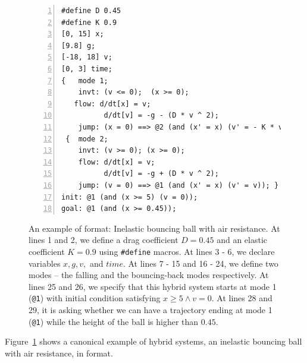 \begin{figure}
  \centering
  \begin{Verbatim}[fontfamily=courier, frame=single, framesep=1mm,
  numbers=left, fontsize=\scriptsize]
#define D 0.45
#define K 0.9
[0, 15] x;
[9.8] g;
[-18, 18] v;
[0, 3] time;
{   mode 1;
    invt: (v <= 0);  (x >= 0);
   flow: d/dt[x] = v;
          d/dt[v] = -g - (D * v ^ 2);
    jump: (x = 0) ==> @2 (and (x' = x) (v' = - K * v)); }
 {  mode 2;
    invt: (v >= 0); (x >= 0);
    flow: d/dt[x] = v;
          d/dt[v] = -g + (D * v ^ 2);
    jump: (v = 0) ==> @1 (and (x' = x) (v' = v)); }
init: @1 (and (x >= 5) (v = 0));
goal: @1 (and (x >= 0.45));
\end{Verbatim}
\caption{An example of \drh{} format: Inelastic bouncing ball with air
  resistance. At lines 1 and 2, we define a drag coefficient $D = 0.45$
  and an elastic coefficient $K = 0.9$ using \texttt{\#define} macros.
  At lines 3 - 6, we declare variables $x, g, v,$ and $time$. At lines
  7 - 15 and 16 - 24, we define two modes -- the falling and the
  bouncing-back modes respectively. At lines 25 and 26, we specify
  that this hybrid system starts at mode 1 (\texttt{@1}) with initial
  condition satisfying $x \ge 5 \land v = 0$. At lines 28 and 29, it
  is asking whether we can have a trajectory ending at mode 1
  (\texttt{@1}) while the height of the ball is higher than $0.45$.}
\label{fig:bouncing-ball-drh}
\end{figure}

Figure~\ref{fig:bouncing-ball-drh} shows a canonical example of hybrid
systems, an inelastic bouncing ball with air resistance, in \drh{}
format.

